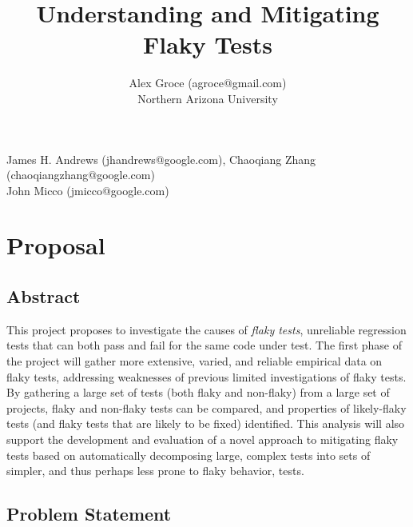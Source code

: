 \documentclass[10pt]{article}
\title{Understanding and Mitigating Flaky Tests}
\author{Alex Groce (agroce@gmail.com)\\Northern Arizona University}
\date{}
\begin{document}
\maketitle


{\scriptsize
{} James H. Andrews (jhandrews@google.com), Chaoqiang Zhang (chaoqiangzhang@google.com) \\
 John Micco (jmicco@google.com)
}
\section{Proposal}

\subsection{Abstract}

This project proposes to investigate the causes of \emph{flaky tests}, unreliable regression tests that can both pass and fail for the same code under test.  The first phase of the project will gather more extensive, varied, and reliable empirical data on flaky tests, addressing weaknesses of previous limited investigations of flaky tests.  By gathering a large set of tests (both flaky and non-flaky) from a large set of projects, flaky and non-flaky tests can be compared, and properties of likely-flaky tests (and flaky tests that are likely to be fixed) identified.  This analysis will also support the development and evaluation of a novel approach to mitigating flaky tests based on automatically decomposing large, complex tests into sets of simpler, and thus perhaps less prone to flaky behavior, tests.

\subsection{Problem Statement}
\end{document}
